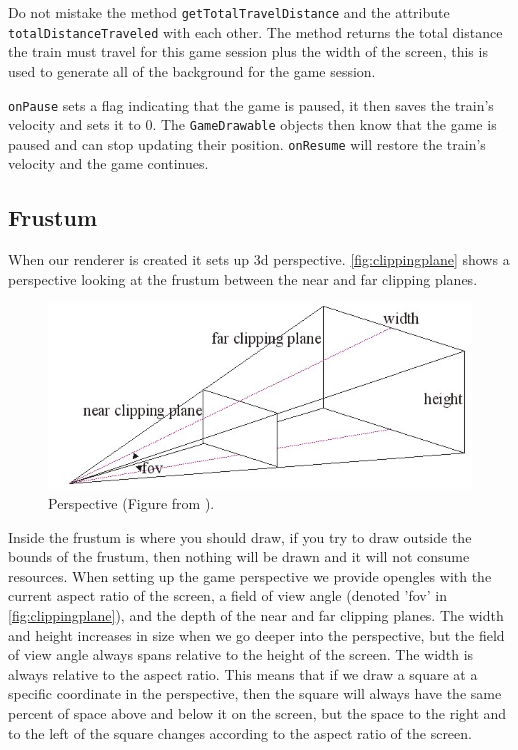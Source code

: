 \begin{description}
Do not mistake the method \lstinline|getTotalTravelDistance| and the attribute \lstinline|totalDistanceTraveled| with each other. The method returns the total distance the train must travel for this game session plus the width of the screen, this is used to generate all of the background for the game session.

\lstinline|onPause| sets a flag indicating that the game is paused, it then saves the train's velocity and sets it to 0. The \lstinline|GameDrawable| objects then know that the game is paused and can stop updating their position. \lstinline|onResume| will restore the train's velocity and the game continues.

\end{description}

\subsection{Frustum}\label{sec:frustum}

When our renderer is created it sets up \ac{3d} perspective. \autoref{fig:clippingplane} shows a perspective looking at the frustum between the near and far clipping planes.
\begin{figure}[H]
\centering
\includegraphics[width=0.9\linewidth]{img/clippingplane.jpg}
\caption{Perspective (Figure from \citep{clippingplane}).}
\label{fig:clippingplane}
\end{figure}
Inside the frustum is where you should draw, if you try to draw outside the bounds of the frustum, then nothing will be drawn and it will not consume resources. When setting up the game perspective we provide \ac{opengles} with the current aspect ratio of the screen, a field of view angle (denoted 'fov' in \autoref{fig:clippingplane}), and the depth of the near and far clipping planes. The width and height increases in size when we go deeper into the perspective, but the field of view angle always spans relative to the height of the screen. The width is always relative to the aspect ratio. This means that if we draw a square at a specific coordinate in the perspective, then the square will always have the same percent of space above and below it on the screen, but the space to the right and to the left of the square changes according to the aspect ratio of the screen.

